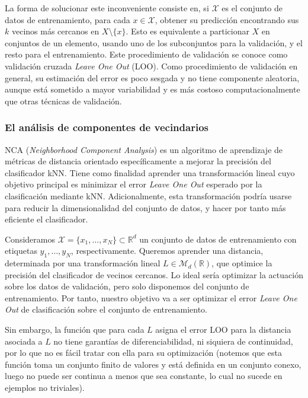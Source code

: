 La forma de solucionar este inconveniente consiste en, si $\mathcal{X}$ es el conjunto de datos de entrenamiento, para cada $x \in \mathcal{X}$, obtener su predicción encontrando sus $k$ vecinos más cercanos en $X  \setminus \{x\}$. Esto es equivalente a particionar $X$ en conjuntos de un elemento, usando uno de los subconjuntos para la validación, y el resto para el entrenamiento. Este procedimiento de validación se conoce como validación cruzada \emph{Leave One Out} (LOO). Como procedimiento de validación en general, su estimación del error es poco sesgada y no tiene componente aleatoria, aunque está sometido a mayor variabilidad y es más costoso computacionalmente que otras técnicas de validación.

\subsubsection{El análisis de componentes de vecindarios}

NCA (\emph{Neighborhood Component Analysis}) \cite{nca} es un algoritmo de aprendizaje de métricas de distancia orientado específicamente a mejorar la precisión del clasificador kNN. Tiene como finalidad aprender una transformación lineal cuyo objetivo principal es minimizar el error \emph{Leave One Out} esperado por la clasificación mediante kNN. Adicionalmente, esta transformación podría usarse para reducir la dimensionalidad del conjunto de datos, y hacer por tanto más eficiente el clasificador.
    
Consideramos $\mathcal{X} = \{x_1,\dots,x_N\} \subset \mathbb{R}^d$ un conjunto de datos de entrenamiento con etiquetas $y_1,\dots,y_N$, respectivamente. Queremos aprender una distancia, determinada por una transformación lineal $L \in \mathcal{M}_{d}(\mathbb{R})$, que optimice la precisión del clasificador de vecinos cercanos. Lo ideal sería optimizar la actuación sobre los datos de validación, pero solo disponemos del conjunto de entrenamiento. Por tanto, nuestro objetivo va a ser optimizar el error \emph{Leave One Out} de clasificación sobre el conjunto de entrenamiento.

Sin embargo, la función que para cada $L$ asigna el error LOO para la distancia asociada a $L$ no tiene garantías de diferenciabilidad, ni siquiera de continuidad, por lo que no es fácil tratar con ella para su optimización (notemos que esta función toma un conjunto finito de valores y está definida en un conjunto conexo, luego no puede ser continua a menos que sea constante, lo cual no sucede en ejemplos no triviales).

